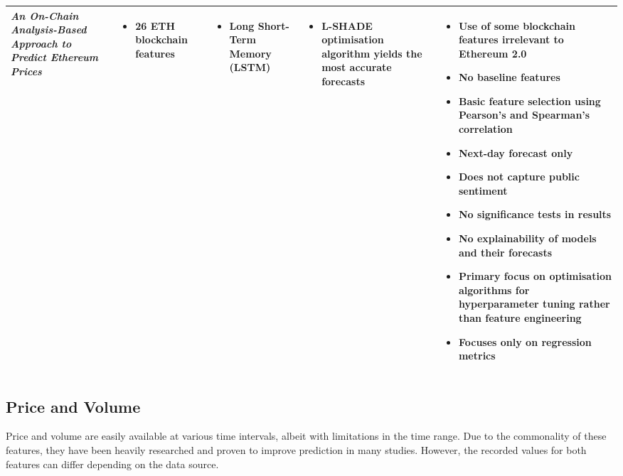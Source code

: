 \documentclass[ %
                    author={Raj Dhakan},
                supervisor={Dr. Ayush Joshi},
                    degree={MSc},
                     title={Ethereum Price Prediction using Internal and External Factors},
                  subtitle={},
                      type={},
                      year={2025}]{dissertation}
\begin{document}
\begin{landscape}
\begin{table}[h]
\begin{tabular}{@{}L{3.5cm} L{5cm} L{4cm} L{4.5cm} L{5.5cm}@{}}
\textit{An On-Chain Analysis-Based Approach to Predict Ethereum Prices \cite{jagannath2021chain}} & 
\begin{itemize}[leftmargin=*, nosep]
    \item 26 ETH blockchain features
\end{itemize}
&
\begin{itemize}[leftmargin=*, nosep]
    \item Long Short-Term Memory (LSTM)
\end{itemize}
&
\begin{itemize}[leftmargin=*, nosep]
    \item L-SHADE optimisation algorithm yields the most accurate forecasts 
\end{itemize}
&
\begin{itemize}[leftmargin=*, nosep]
  \item Use of some blockchain features irrelevant to Ethereum 2.0
  \item No baseline features
  \item Basic feature selection using Pearson's and Spearman's correlation
  \item Next-day forecast only
  \item Does not capture public sentiment
  \item No significance tests in results
  \item No explainability of models and their forecasts
  \item Primary focus on optimisation algorithms for hyperparameter tuning rather than feature engineering
  \item Focuses only on regression metrics
\end{itemize} \\
\bottomrule
\end{tabular}
\end{table}
\end{landscape}

\subsection{Price and Volume}
Price and volume are easily available at various time intervals, albeit with limitations in the time range. Due to the commonality of these features, they have been heavily researched and proven to improve prediction in many studies. However, the recorded values for both features can differ depending on the data source.\cite{john2024cryptocurrency}
\end{document}
